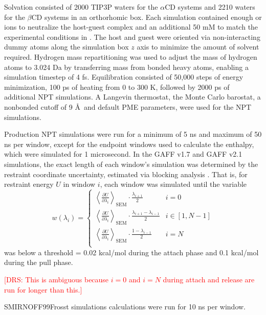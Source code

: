 \documentclass[9pt,lineno]{elife}
\newcommand{\drsnote}[1]{ {\textcolor{red} { [DRS: #1] }}}
\newcommand{\drsnote}[1]{}
\begin{document}
Solvation consisted of 2000 TIP3P waters for the $\alpha$CD systems and 2210 waters for the $\beta$CD systems in an orthorhomic box. Each simulation contained enough  or  ions to neutralize the host-guest complex  and an additional 50 mM  to match the experimental conditions in \cite{rekharsky_thermodynamic_1997}. The host and guest were oriented via non-interacting dummy atoms along the simulation box $z$ axis to minimize the amount of solvent required. Hydrogen mass repartitioning was used to adjust the mass of hydrogen atoms to 3.024 Da by transferring mass from bonded heavy atoms, enabling a simulation timestep of 4 fs. Equilibration consisted of 50,000 steps of energy minimization, 100 ps of heating from 0 to 300 K, followed by 2000 ps of additional NPT simulations. A Langevin thermostat, the Monte Carlo barostat, a nonbonded cutoff of 9 \AA\ and default PME parameters, were used for the NPT simulations.

Production NPT simulations were run for a minimum of 5 ns and maximum of 50 ns per window, except for the endpoint windows used to calculate the enthalpy, which were simulated for 1 microsecond. In the GAFF v1.7 and GAFF v2.1 simulations, the exact length of each window's simulation was determined by the restraint coordinate uncertainty, estimated via blocking analysis \cite{flyvbjerg_error_1989}. That is, for restraint energy $U$ in window $i$, each window was simulated until the variable
\begin{equation}
    w(\lambda_i) = 
    \begin{cases}
    \left\langle \frac{\partial U}{\partial \lambda_i} \right\rangle_\text{SEM} \cdot \frac{\lambda_{i+1}}{2} & i = 0 \\
    \left\langle \frac{\partial U}{\partial \lambda_i} \right\rangle_\text{SEM} \cdot \frac{\lambda_{i+1} - \lambda_{i-1}}{2} & i \in [1, N-1] \\
    \left\langle \frac{\partial U}{\partial \lambda_i} \right\rangle_\text{SEM} \cdot \frac{1 - \lambda_{i-1}}{2} & i = N \\
    \end{cases}
\end{equation}
was below a threshold = 0.02 kcal/mol during the attach phase and 0.1 kcal/mol during the pull phase.

\drsnote{This is ambiguous because $i=0$ and $i=N$ during attach and release are run for longer than this.}

SMIRNOFF99Frosst simulations calculations were run for 10 ns per window.
\end{document}
